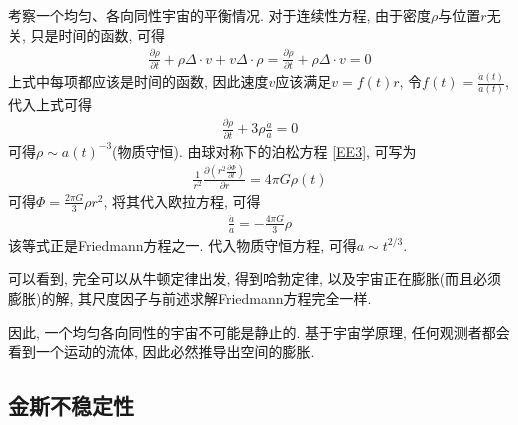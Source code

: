 考察一个均匀、各向同性宇宙的平衡情况. 对于连续性方程, 由于密度$\rho$与位置$r$无关, 只是时间的函数, 可得
\begin{align*}
    \frac{\partial \rho}{\partial t}+\rho \Delta\cdot v+v \Delta \cdot \rho=\frac{\partial \rho}{\partial t}+\rho\Delta\cdot v=0
\end{align*}
上式中每项都应该是时间的函数, 因此速度$v$应该满足$v=f(t)r$,  令$f(t)=\frac{\dot{a}(t)}{a(t)}$, 代入上式可得
\begin{align*}
    \frac{\partial \rho}{\partial t}+3\rho\frac{\dot{a}}{a}=0
\end{align*}
可得$\rho\sim a(t)^{-3}$(物质守恒).  由球对称下的泊松方程 \ref{EE3}, 可写为
\begin{align*}
    \frac{1}{r^2}\frac{\partial \left( r^2\frac{\partial \Phi}{\partial t} \right)}{\partial r}=4\pi G\rho(t)
\end{align*}
可得$\Phi=\frac{2\pi G}{3}\rho r^2$, 将其代入欧拉方程, 可得
\begin{align*}
    \frac{\ddot{a}}{a}=-\frac{4\pi G}{3}\rho
\end{align*}
该等式正是Friedmann方程之一. 代入物质守恒方程, 可得$a\sim t^{2/3}$. 

可以看到, 完全可以从牛顿定律出发, 得到哈勃定律, 以及宇宙正在膨胀(而且必须膨胀)的解, 其尺度因子与前述求解Friedmann方程完全一样. 

因此, 一个均匀各向同性的宇宙不可能是静止的. 基于宇宙学原理, 任何观测者都会看到一个运动的流体, 因此必然推导出空间的膨胀. 

\subsection{金斯不稳定性}
